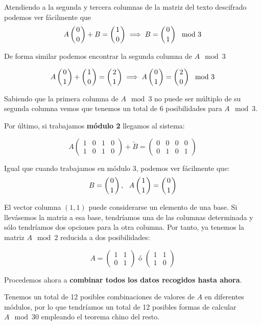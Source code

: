\begin{problem}[6]
Atendiendo a la segunda y tercera columnas de la matriz del texto descifrado podemos ver fácilmente que
\[A \left(0 \atop 0 \right) + B = \left(1 \atop 0\right)\implies B = \left(0 \atop 1  \right) \mod 3\]

De forma similar podemos encontrar la segunda columna de $A \mod 3$

\[A \left(0 \atop 1 \right) + \left(1 \atop 0 \right) = \left(2 \atop 1\right)\implies A \left(0 \atop 1 \right) = \left( 2 \atop 0 \right) \mod 3\]

Sabiendo que la primera columna de $A \mod 3$ no puede ser múltiplo de su segunda columna vemos que tenemos un total de 6 posibilidades para $A \mod 3$.

Por último, si trabajamos \textbf{módulo 2} llegamos al sistema:

\[A \left( \begin{array}{cccc}
		1 & 0 & 1 & 0\\
		1 & 0 & 1 & 0
	\end{array} \right) + \tilde{B} = \left( \begin{array}{cccc}
		0 & 0 & 0 & 0\\
		0 & 1 & 0 & 1
	\end{array} \right)\]

Igual que cuando trabajamos en módulo 3, podemos ver fácilmente que:
\[B = \left( 0 \atop 1\right) , \ \ A \left( 1 \atop 1 \right) = \left( 0 \atop 1 \right)\]

El vector columna $(1,1)$ puede considerarse un elemento de una base. Si llevásemos la matriz a esa base, tendríamos una de las columnas determinada y sólo tendríamos dos opciones para la otra columna. Por tanto, ya tenemos la matriz $A \mod 2$ reducida a dos posibilidades:

\[A = \left( \begin{array}{cc}1 & 1 \\ 0 & 1 \end{array}\right) \text{ ó } \left( \begin{array}{cc}1 & 1 \\ 1 & 0 \end{array}\right)\]

Procedemos ahora a \textbf{combinar todos los datos recogidos hasta ahora}.

Tenemos un total de 12 posibles combinaciones de valores de $A$ en diferentes módulos, por lo que tendríamos un total de 12 posibles formas de calcular $A \mod 30$ empleando el teorema chino del resto.


\end{problem}
